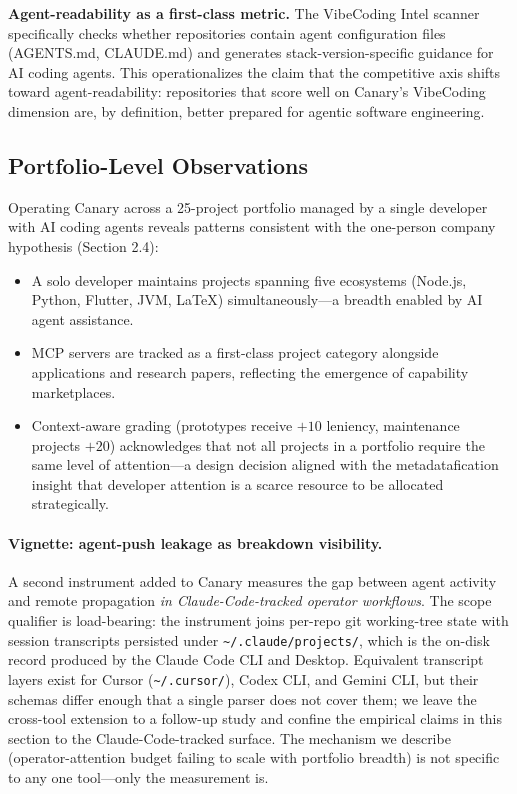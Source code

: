 \documentclass[12pt]{article}
\begin{document}
\textbf{Agent-readability as a first-class metric.} The VibeCoding Intel scanner specifically checks whether repositories contain agent configuration files (AGENTS.md, CLAUDE.md) and generates stack-version-specific guidance for AI coding agents. This operationalizes the claim that the competitive axis shifts toward agent-readability: repositories that score well on Canary's VibeCoding dimension are, by definition, better prepared for agentic software engineering.

\subsection{Portfolio-Level Observations}

Operating Canary across a 25-project portfolio managed by a single developer with AI coding agents reveals patterns consistent with the one-person company hypothesis (Section 2.4):

\begin{itemize}
  \item A solo developer maintains projects spanning five ecosystems (Node.js, Python, Flutter, JVM, LaTeX) simultaneously---a breadth enabled by AI agent assistance.
  \item MCP servers are tracked as a first-class project category alongside applications and research papers, reflecting the emergence of capability marketplaces.
  \item Context-aware grading (prototypes receive $+10$ leniency, maintenance projects $+20$) acknowledges that not all projects in a portfolio require the same level of attention---a design decision aligned with the metadatafication insight that developer attention is a scarce resource to be allocated strategically.
\end{itemize}

\paragraph{Vignette: agent-push leakage as breakdown visibility.}
A second instrument added to Canary measures the gap between agent activity and remote propagation \textit{in Claude-Code-tracked operator workflows}. The scope qualifier is load-bearing: the instrument joins per-repo git working-tree state with session transcripts persisted under \texttt{\textasciitilde/.claude/projects/}, which is the on-disk record produced by the Claude Code CLI and Desktop. Equivalent transcript layers exist for Cursor (\texttt{\textasciitilde/.cursor/}), Codex CLI, and Gemini CLI, but their schemas differ enough that a single parser does not cover them; we leave the cross-tool extension to a follow-up study and confine the empirical claims in this section to the Claude-Code-tracked surface. The mechanism we describe (operator-attention budget failing to scale with portfolio breadth) is not specific to any one tool---only the measurement is.
\end{document}

